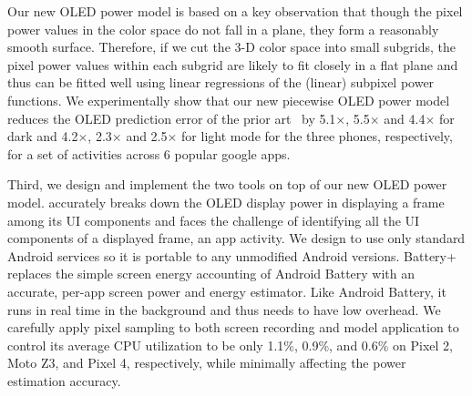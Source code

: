 Our new OLED power model is based on a key observation that though the
pixel power values in the color space do not fall in a plane,
they form a reasonably smooth surface.  Therefore, if we cut
the 3-D color space into small subgrids, the pixel power values within
each subgrid are likely to fit closely in a flat plane and thus can be
fitted well using linear regressions of the (linear) subpixel power
functions. We experimentally show that our new piecewise OLED power model reduces the
OLED prediction error of the prior art~\cite{park2015accurate} by
5.1$\times$, 5.5$\times$ and 4.4$\times$ for dark
and 4.2$\times$, 2.3$\times$ and 2.5$\times$ for light mode for the three phones,
respectively, for a set of activities across 6 popular google apps.



Third, we design and implement the two tools on top of our new OLED
power model. \name accurately breaks down the OLED display power in
displaying a frame among its UI components and faces the challenge of
identifying all the UI components of a displayed frame, \eg an app
activity.
We design \name to use only standard Android services so
it is portable to any unmodified Android versions.
Battery+ replaces
the simple screen energy accounting of Android Battery with an
accurate, per-app screen power and energy estimator.  Like Android
Battery, it runs in real time in the background and thus needs to have low
overhead. We carefully apply pixel sampling to both screen recording
and model application to control its average CPU utilization to be
only 1.1\%, 0.9\%, and 0.6\% on Pixel 2, Moto Z3, and Pixel 4, respectively,
while minimally affecting the power estimation accuracy.


